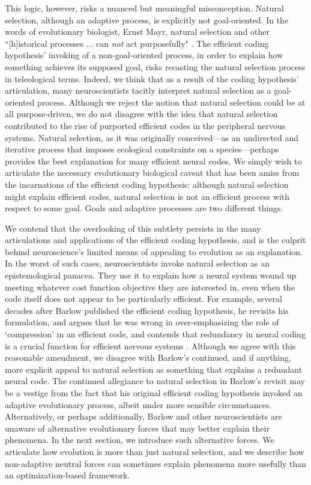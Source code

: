 \documentclass[twocolumn]{article}
\begin{document}
This logic, however, risks a nuanced but meaningful misconception. Natural selection, although an adaptive process, is explicitly not goal-oriented. In the words of evolutionary biologist, Ernst Mayr, natural selection and other ``[h]istorical processes ... can \textit{not} act purposefully" \cite{mayr_1961}. The efficient coding hypothesis' invoking of a non-goal-oriented process, in order to explain how something achieves its supposed goal, risks recasting the natural selection process in teleological terms. Indeed, we think that as a result of the coding hypothesis' articulation, many neuroscientists tacitly interpret natural selection as a goal-oriented process. Although we reject the notion that natural selection could be at all purpose-driven, we do not disagree with the idea that natural selection contributed to the rise of purported efficient codes in the peripheral nervous systems. Natural selection, as it was originally conceived---as an undirected and iterative process that imposes ecological constraints on a species---perhaps provides the best explanation for many efficient neural codes. We simply wish to articulate the necessary evolutionary biological caveat that has been amiss from the incarnations of the efficient coding hypothesis: although natural selection might explain efficient codes, natural selection is not an efficient process with respect to some goal. Goals and adaptive processes are two different things.

We contend that the overlooking of this subtlety persists in the many articulations and applications of the efficient coding hypothesis, and is the culprit behind neuroscience's limited means of appealing to evolution as an explanation. In the worst of such cases, neuroscientists invoke natural selection as an epistemological panacea. They use it to explain how a neural system wound up meeting whatever cost function objective they are interested in, even when the code itself does not appear to be particularly efficient. For example, several decades after Barlow published the efficient coding hypothesis, he revisits his formulation, and argues that he was wrong in over-emphasizing the role of `compression' in an efficient code, and contends that redundancy in neural coding is a crucial function for efficient nervous systems \cite{barlow_2001}. Although we agree with this reasonable amendment, we disagree with Barlow's continued, and if anything, more explicit appeal to natural selection as something that explains a redundant neural code. The continued allegiance to natural selection in Barlow's revisit may be a vestige from the fact that his original efficient coding hypothesis invoked an adaptive evolutionary process, albeit under more sensible circumstances. Alternatively, or perhaps additionally, Barlow and other neuroscientists are unaware of alternative evolutionary forces that may better explain their phenomena. In the next section, we introduce such alternative forces. We articulate how evolution is more than just natural selection, and we describe how non-adaptive neutral forces can sometimes explain phenomena more usefully than an optimization-based framework. 
\end{document}
